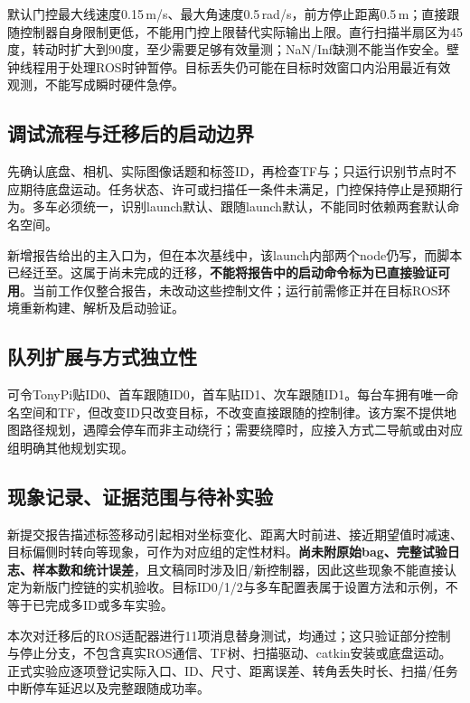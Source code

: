 默认门控最大线速度0.15\,m/s、最大角速度0.5\,rad/s，前方停止距离0.5\,m；直接跟随控制器自身限制更低，不能用门控上限替代实际输出上限。直行扫描半扇区为45度，转动时扩大到90度，至少需要足够有效量测；NaN/Inf缺测不能当作安全。壁钟线程用于处理ROS时钟暂停。目标丢失仍可能在目标时效窗口内沿用最近有效观测，不能写成瞬时硬件急停。

\subsection{调试流程与迁移后的启动边界}
先确认底盘、相机、实际图像话题和标签ID，再检查TF与；只运行识别节点时不应期待底盘运动。任务状态、许可或扫描任一条件未满足，门控保持停止是预期行为。多车必须统一，识别launch默认、跟随launch默认，不能同时依赖两套默认命名空间。

新增报告给出的主入口为，但在本次基线中，该launch内部两个node仍写，而脚本已经迁至。这属于尚未完成的迁移，\textbf{不能将报告中的启动命令标为已直接验证可用}。当前工作仅整合报告，未改动这些控制文件；运行前需修正并在目标ROS环境重新构建、解析及启动验证。

\subsection{队列扩展与方式独立性}
可令TonyPi贴ID0、首车跟随ID0，首车贴ID1、次车跟随ID1。每台车拥有唯一命名空间和TF，但改变ID只改变目标，不改变直接跟随的控制律。该方案不提供地图路径规划，遇障会停车而非主动绕行；需要绕障时，应接入方式二导航或由对应组明确其他规划实现。

\subsection{现象记录、证据范围与待补实验}
新提交报告描述标签移动引起相对坐标变化、距离大时前进、接近期望值时减速、目标偏侧时转向等现象，可作为对应组的定性材料。\textbf{尚未附原始bag、完整试验日志、样本数和统计误差}，且文稿同时涉及旧/新控制器，因此这些现象不能直接认定为新版门控链的实机验收。目标ID0/1/2与多车配置表属于设置方法和示例，不等于已完成多ID或多车实验。

本次对迁移后的ROS适配器进行11项消息替身测试，均通过；这只验证部分控制与停止分支，不包含真实ROS通信、TF树、扫描驱动、catkin安装或底盘运动。正式实验应逐项登记实际入口、ID、尺寸、距离误差、转角丢失时长、扫描/任务中断停车延迟以及完整跟随成功率。

